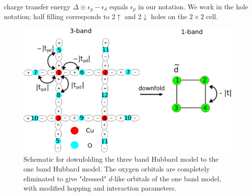charge transfer energy $\Delta \equiv \epsilon_p - \epsilon_d$ equals $\epsilon_p$ in our notation. 
We work in the hole notation; half filling corresponds to 2$\uparrow$ and 2$\downarrow$ holes on the $2\times2$ cell.
\begin{figure}[htpb]
\centering
\includegraphics[width=0.8\linewidth]{./Figures/three_band_figure.pdf}
\caption{Schematic for downfolding the three band Hubbard model to the one band Hubbard model. 
The oxygen orbitals are completely eliminated to give "dressed" $d$-like orbitals of the one band model, with modified hopping 
and interaction parameters.}
\label{fig:threeband} 
\end{figure}	

